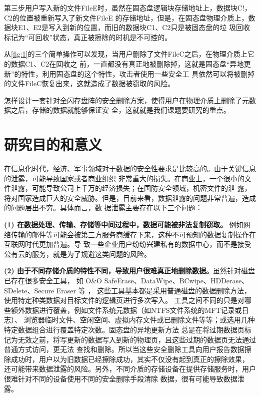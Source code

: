 第三步用户写入新的文件FileE时，虽然在固态盘逻辑块存储地址上，数据块C!，C2的位置被重新写入了新文件FileE
的存储地址，但是，在固态盘物理介质上，数据块E1、E2是写入到新的位置，而旧的数据块C1、C2只是被固态盘的垃
圾回收标记为“可回收”状态，真正被擦除的时机是不可控的。


从\autoref{fig:1}的三个简单操作可以发现，当用户删除了文件FileC之后，在物理介质上它的数据C1、C2在回收之
前，一直都没有真正地被删除掉，这就是固态盘“异地更新”的特性，利用固态盘的这个特性，攻击者使用一些安全工
具依然可以将被删掉的文件FileC恢复出来，这就造成了数据被窃取的风险。


怎样设计一套针对全闪存盘阵的安全删除方案，使得用户在物理介质上删除了元数据之后，存储的数据就能够保证安
全，这就就是我们课题要研究的重点。
\section{研究目的和意义}
在信息化时代，经济、军事领域对于数据的安全性要求是比较高的。由于关键信息的泄露，可能导致国家或者商业组织
非常重大的损失。在商业上，一个很小的文件泄露，可能导致公司上千万的经济损失；在国防安全领域，机密文件的泄
露，将对国家造成巨大的安全威胁。但是，目前来看，数据泄露的问题非常普遍，造成的问题层出不穷。具体而言，数
据泄露主要存在以下三个问题：


\textbf{(1) 在数据处理、传输、存储等中间过程中，数据可能被非法复制窃取。}
例如网络传输的邮件等可能会被第三方服务商缓存下来，这种不可预知的数据复制操作在互联网时代更加普遍。导
致一些企业用户纷纷兴建私有的数据中心，而不是接受公有云的服务，就是为了规避这类问题的风险。


\textbf{(2) 由于不同存储介质的特性不同，导致用户很难真正地删除数据。}虽然针对磁盘已存在很多安全工具，
如 O\&O SafeErase、DataWipe、BCwipe、HDDerase、SDelete、Secure Eraser 等\cite{safe-erase,secure-eraser,bcwipe} ，
这些工具基本都是采用普通磁盘的数据删除方法，使用特定种类数据对目标文件的逻辑页进行多次写入。
工具之间不同的只是对哪些额外数据进行覆盖，例如文件系统元数据（如NTFS文件系统的MFT记录或日志）\cite{Huebner2006Data}、
浏览器临时文件、空闲空间、虚拟内存文件或已删除文件等等；或选用几种特定数据组合进行覆盖特定次数。固态盘的异地更新方法
总是在将过期数据页标记为无效之前，将写更新的数据写入到新的物理页，且这些过期的数据页无法通过普通方式访问，更无法
查找和删除。所以当这些安全删除工具向用户报告数据擦除成功时，用户以为旧数据已经擦除成功，其实不仅没有起到真正的擦除效果，
还可能带来数据泄露的风险。另外，不同介质的存储设备在提供存储服务时，用户很难针对不同的设备使用不同的安全删除手段清除
数据，很有可能导致数据泄露。


